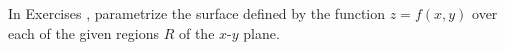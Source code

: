 {\noindent In Exercises}
{, parametrize the surface defined by the function $z=f(x,y)$ over each of the given regions $R$ of the $x$-$y$ plane.
}
